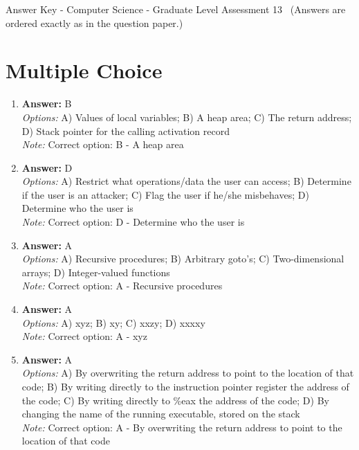 \documentclass[12pt]{article}
\begin{document}
\begin{center}
Answer Key - Computer Science - Graduate Level Assessment 13 \
\small (Answers are ordered exactly as in the question paper.)
\end{center}

\section*{Multiple Choice}
\begin{enumerate}[label=\arabic*.]
\item \textbf{Answer:} B
\\ \textit{Options:} A) Values of local variables; B) A heap area; C) The return address; D) Stack pointer for the calling activation record
\\ \textit{Note:} Correct option: B - A heap area
\item \textbf{Answer:} D
\\ \textit{Options:} A) Restrict what operations/data the user can access; B) Determine if the user is an attacker; C) Flag the user if he/she misbehaves; D) Determine who the user is
\\ \textit{Note:} Correct option: D - Determine who the user is
\item \textbf{Answer:} A
\\ \textit{Options:} A) Recursive procedures; B) Arbitrary goto's; C) Two-dimensional arrays; D) Integer-valued functions
\\ \textit{Note:} Correct option: A - Recursive procedures
\item \textbf{Answer:} A
\\ \textit{Options:} A) xyz; B) xy; C) xxzy; D) xxxxy
\\ \textit{Note:} Correct option: A - xyz
\item \textbf{Answer:} A
\\ \textit{Options:} A) By overwriting the return address to point to the location of that code; B) By writing directly to the instruction pointer register the address of the code; C) By writing directly to \%eax the address of the code; D) By changing the name of the running executable, stored on the stack
\\ \textit{Note:} Correct option: A - By overwriting the return address to point to the location of that code
\end{enumerate}
\end{document}
